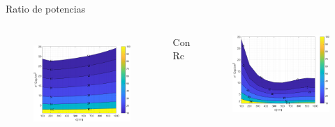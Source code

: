 \documentclass[spanish,a4paper]{beamer}%
\begin{document}
\begin{frame}{Ratio de potencias}
\begin{columns}
\begin{minipage}[l]{.1\columnwidth}
					\end{minipage}\hfill
					\begin{minipage}[r]{.9\columnwidth}
						\begin{figure}[h]%
								\flushright
										\includegraphics[width=0.8\columnwidth]{SiGe_full}
								\label{fig:SiSiO2Ge_relfull}%
						\end{figure}
						\end{minipage}
						\hfill \vfill
					\vspace{-10pt}
						\begin{block}{\centering Con Rc}
							\end{block}
					\vspace{0pt}
					\begin{minipage}[c]{.9\columnwidth}
						\begin{figure}[h]%
								\centering
										\includegraphics[width=0.81\columnwidth]{SiGe_Rc}%

\end{figure}
\end{minipage}
\end{columns}
\end{frame}
\end{document}
